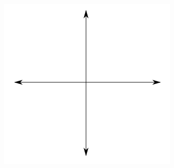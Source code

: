 \documentclass[a4paper,10pt]{article}
\begin{document}
\begin{figure}[H]
\includegraphics[scale=0.5]{plot.png}
\end{figure}
\vspace{0.5cm}\\
\end{document}
